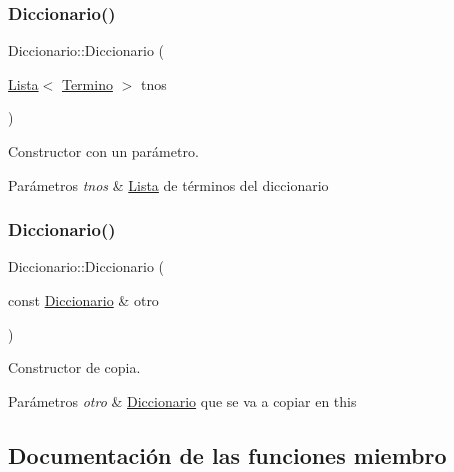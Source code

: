 \subsubsection{\texorpdfstring{Diccionario()}{Diccionario()}\hspace{0.1cm}{\footnotesize\ttfamily [1/2]}}
{\footnotesize\ttfamily Diccionario\+::\+Diccionario (\begin{DoxyParamCaption}\item[{\mbox{\hyperlink{classLista}{Lista}}$<$ \mbox{\hyperlink{classTermino}{Termino}} $>$}]{tnos }\end{DoxyParamCaption})}



Constructor con un parámetro. 


\begin{DoxyParams}{Parámetros}
{\em tnos} & \mbox{\hyperlink{classLista}{Lista}} de términos del diccionario \\
\hline
\end{DoxyParams}
\mbox{\label{classDiccionario_a5f79e840a08666f29b527eb78be167e0}} 
\subsubsection{\texorpdfstring{Diccionario()}{Diccionario()}\hspace{0.1cm}{\footnotesize\ttfamily [2/2]}}
{\footnotesize\ttfamily Diccionario\+::\+Diccionario (\begin{DoxyParamCaption}\item[{const \mbox{\hyperlink{classDiccionario}{Diccionario}} \&}]{otro }\end{DoxyParamCaption})}



Constructor de copia. 


\begin{DoxyParams}{Parámetros}
{\em otro} & \mbox{\hyperlink{classDiccionario}{Diccionario}} que se va a copiar en this \\
\hline
\end{DoxyParams}


\subsection{Documentación de las funciones miembro}
\mbox{\label{classDiccionario_ac5b159cfde287d6964be059380a94a88}} 
